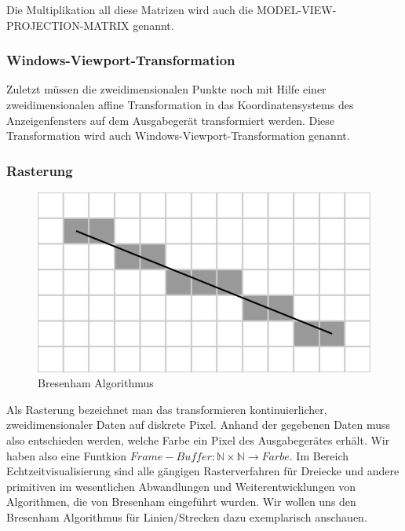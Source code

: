 Die Multiplikation all diese Matrizen wird auch die MODEL-VIEW-PROJECTION-MATRIX genannt. 

\subsubsection*{Windows-Viewport-Transformation}
Zuletzt müssen die zweidimensionalen Punkte noch mit Hilfe einer zweidimensionalen affine Transformation  in das Koordinatensystems des Anzeigenfensters auf dem Ausgabegerät transformiert werden. 
Diese Transformation wird auch Windows-Viewport-Transformation genannt.

\subsubsection{Rasterung}
\begin{figure}[H]
    \centering
    \includegraphics[width=1.0\textwidth]{images/bresenham.png}
    \caption{Bresenham Algorithmus}
    \label{fig:gimbal+lock}
\end{figure}
Als Rasterung bezeichnet man das transformieren kontinuierlicher, zweidimensionaler Daten auf diskrete Pixel.
Anhand der gegebenen Daten muss also entschieden werden, welche Farbe ein Pixel des Ausgabegerätes erhält.
Wir haben also eine Funtkion $Frame-Buffer: \mathbb{N} \times \mathbb{N} \to Farbe$.
Im Bereich Echtzeitvisualisierung  sind alle gängigen Rasterverfahren für Dreiecke und andere primitiven  im wesentlichen Abwandlungen und Weiterentwicklungen  von Algorithmen, die von  Bresenham eingeführt wurden. Wir wollen uns den Bresenham Algorithmus für Linien/Strecken dazu exemplarisch anschauen.

\begin{Algorithmus}
\end{Algorithmus}

